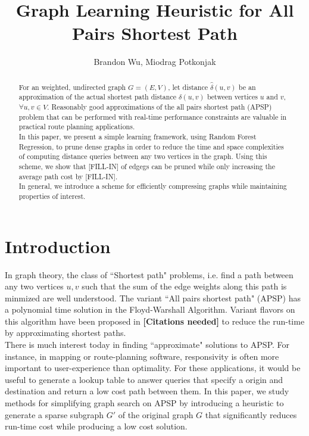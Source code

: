 \documentclass[10.5pt,journal]{IEEEtran}
\begin{document}
%
\title{Graph Learning Heuristic for All Pairs Shortest Path}
\author{Brandon Wu, Miodrag Potkonjak}
\maketitle

\begin{abstract}
For an weighted, undirected graph $G = (E,V)$, let distance $\hat{\delta}(u,v)$ be an approximation of the actual
shortest path distance $\delta(u,v)$ between vertices $u$ and $v$, $\forall u,v\in V$. Reasonably good
approximations of the all pairs shortest path (APSP) problem that can be performed with 
real-time performance constraints are valuable in practical route planning applications.\\

In this paper, we present a simple learning framework, using Random Forest Regression, to prune dense graphs
in order to reduce the time and space complexities of computing distance queries between any two vertices in
the graph. Using this scheme, we show that [FILL-IN] of edgegs can be pruned while only increasing the average
path cost by [FILL-IN].\\

In general, we introduce a scheme for efficiently compressing graphs while maintaining properties of interest.
\end{abstract}

\section{Introduction}
In graph theory, the class of ``Shortest path" problems, i.e. find a path between any two vertices $u,v$ such
that the sum of the edge weights along this path is minmized are well understood. The variant ``All pairs
shortest path" (APSP) has a polynomial time solution in the Floyd-Warshall Algorithm. Variant flavors on this
algorithm have been proposed in 
{\bf{[Citations needed]}}
to reduce the run-time by approximating shortest paths. \\

There is much interest today in finding ``approximate" solutions to APSP. For instance, in mapping or route-planning
software, responsivity is often more important to user-experience than optimality. For these applications, it would
be useful to generate a lookup table to answer queries that specify a origin and destination and return a
low cost path between them. In this paper, we study methods for simplifying graph search on APSP by introducing
a heuristic to generate a sparse subgraph $G'$ of the original graph $G$ that significantly reduces run-time
cost while producing a low cost solution.
\end{document}
